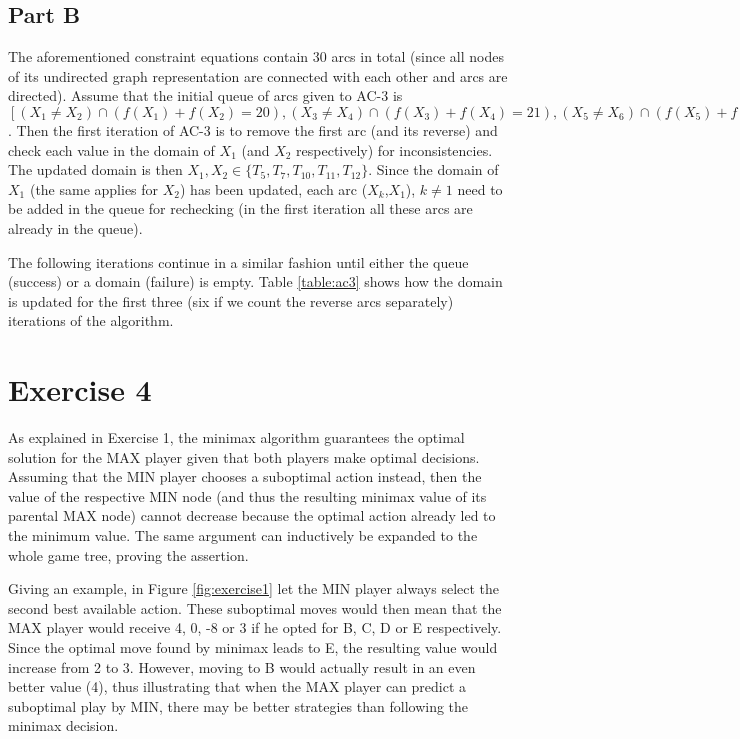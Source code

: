 \subsection*{Part B}



The aforementioned constraint equations contain 30 arcs in total (since all nodes of its undirected graph representation are connected with each other and arcs are directed). Assume that the initial queue of arcs given to AC-3 is $[(X_1 \ne X_2) \cap (f(X_1) + f(X_2) = 20), (X_3 \ne X_4) \cap (f(X_3) + f(X_4) = 21), (X_5 \ne X_6) \cap (f(X_5) + f(X_6) = 22), X_1 \ne X_3, X_1 \ne X_4, ..., X_4 \ne X_6]$. Then the first iteration of AC-3 is to remove the first arc (and its reverse) and check each value in the domain of $X_1$ (and $X_2$ respectively) for inconsistencies. The updated domain is then $X_1, X_2 \in \{T_5, T_7, T_{10}, T_{11}, T_{12}\}$. Since the domain of $X_1$ (the same applies for $X_2$) has been updated, each arc ($X_k$,$X_1$), $k\ne1$ need to be added in the queue for rechecking (in the first iteration all these arcs are already in the queue).

The following iterations continue in a similar fashion until either the queue (success) or a domain (failure) is empty. Table \ref{table:ac3} shows how the domain is updated for the first three (six if we count the reverse arcs separately) iterations of the algorithm.


\section*{Exercise 4}

As explained in Exercise 1, the minimax algorithm guarantees the optimal solution for the MAX player given that both players make optimal decisions. Assuming that the MIN player chooses a suboptimal action instead, then the value of the respective MIN node (and thus the resulting minimax value of its parental MAX node) cannot decrease because the optimal action already led to the minimum value. The same argument can inductively be expanded to the whole game tree, proving the assertion.

Giving an example, in Figure \ref{fig:exercise1} let the MIN player always select the second best available action. These suboptimal moves would then mean that the MAX player would receive 4, 0, -8 or 3 if he opted for B, C, D or E respectively. Since the optimal move found by minimax leads to E, the resulting value would increase from 2 to 3. However, moving to B would actually result in an even better value (4), thus illustrating that when the MAX player can predict a suboptimal play by MIN, there may be better strategies than following the minimax decision.


